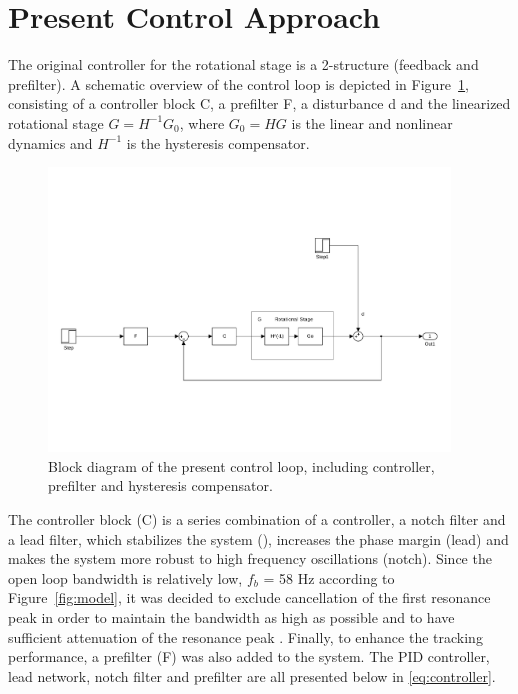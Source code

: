 \section{Present Control Approach}\label{sec:presentControlApproach}
The original controller for the rotational stage is a 2-\abbrDOF structure (feedback and prefilter). A schematic overview of the control loop is depicted in Figure~\ref{fig:present}, consisting of a controller block C, a prefilter F, a disturbance d and the linearized rotational stage $G = H^{-1}G_0$, where $G_0 = HG$ is the linear and nonlinear dynamics and $H^{-1}$ is the hysteresis compensator.

\begin{figure}[h!]
  \centering %
  \includegraphics[width=0.95\textwidth, trim=4cm 4cm 2.1cm 10cm, clip=true]{fig/matlab/present_controller}
  \caption{\label{fig:present}Block diagram of the present control loop, including controller, prefilter and hysteresis compensator.}
\end{figure}

The controller block (C) is a series combination of a \abbrPID controller, a notch filter and a lead filter, which stabilizes the system (\abbrPID), increases the phase margin (lead) and makes the system more robust to high frequency oscillations (notch). Since the open loop bandwidth is relatively low, $f_b$ = 58 Hz according to Figure~\ref{fig:model}, it was decided to exclude cancellation of the first resonance peak in order to maintain the bandwidth as high as possible and to have sufficient attenuation of the resonance peak \citep{ButcherController:2015}. Finally, to enhance the tracking performance, a prefilter (F) was also added to the system. The PID controller, lead network, notch filter and prefilter are all presented below in \eqref{eq:controller}.

